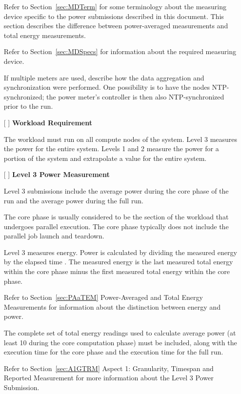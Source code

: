 \begin{itemize}
Refer to Section~\ref{sec:MDTerm} for some terminology about the measuring device specific to the power submissions described in this document. This section describes the difference between power-averaged measurements and total energy measurements.

Refer to Section~\ref{sec:MDSpecs} for information about the required measuring device.

If multiple meters are used, describe how the data aggregation and synchronization were performed. One possibility is to have the nodes NTP-synchronized; the power meter's controller is then also NTP-synchronized prior to the run.

\item[{[ ]}]
\textbf{Workload Requirement}

The workload must run on all compute nodes of the system. Level 3 measures the power for the entire system. Levels 1 and 2 measure the power for a portion of the system and extrapolate a value for the entire system. 

\item[{[ ]}]
\textbf{Level 3 Power Measurement}

Level 3 submissions include the average power during the core phase of the run and the average power during the full run.

The core phase is usually considered to be the section of the workload that undergoes parallel execution. The core phase typically does not include the parallel job launch and teardown.

Level 3 measures energy. Power is calculated by dividing the measured energy by the elapsed time . The measured energy is the last measured total energy within the core phase minus the first measured total energy within the core phase.

Refer to Section~\ref{sec:PAaTEM} Power-Averaged and Total Energy Measurements for information about the distinction between energy and power.

The complete set of total energy readings used to calculate average power (at least 10 during the core computation phase) must be included, along with the execution time for the core phase and the execution time for the full run.

Refer to Section~\ref{sec:A1GTRM} Aspect 1: Granularity, Timespan and Reported Measurement for more 
information about the Level 3 Power Submission.


\end{itemize}
